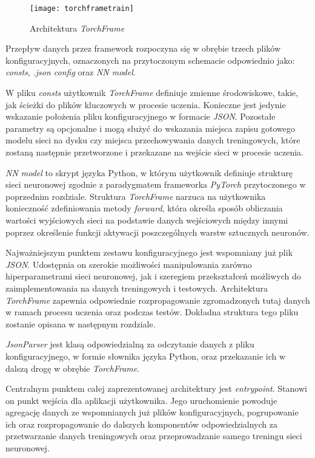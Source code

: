       \begin{figure}[h!]
        \centering
        \texttt{[image: torchframetrain]}
        \caption[Architektura \textit{TorchFrame} - źródło: Rysunek własny]{Architektura \textit{TorchFrame}}
        \label{fig:torchframetrain}
      \end{figure}

    Przepływ danych przez framework rozpoczyna się w obrębie trzech plików konfiguracyjnych,
    oznaczonych na przytoczonym schemacie odpowiednio jako: \textit{consts}, \textit{.json config}
    oraz \textit{NN model}.

    W pliku \textit{consts} użytkownik \textit{TorchFrame} definiuje zmienne środowiskowe, takie, jak
    ścieżki do plików kluczowych w procesie uczenia. Konieczne jest jedynie wskazanie
    położenia pliku konfiguracyjnego w formacie \textit{JSON}. Pozostałe parametry są opcjonalne
    i mogą służyć do wskazania miejsca zapisu gotowego modelu sieci na dysku czy miejsca
    przechowywania danych treningowych, które zostaną następnie przetworzone i przekazane
    na wejście sieci w procesie uczenia.

    \textit{NN model} to skrypt języka Python, w którym użytkownik definiuje strukturę sieci
    neuronowej zgodnie z paradygmatem frameworka \textit{PyTorch} przytoczonego w poprzednim
    rozdziale. Struktura \textit{TorchFrame} narzuca na użytkownika konieczność zdefiniowania
    metody \textit{forward}, która określa sposób obliczania wartości wyjściowych sieci na podstawie danych
    wejściowych między innymi poprzez określenie funkcji aktywacji poszczególnych warstw
    sztucznych neuronów.

    Najważniejszym punktem zestawu konfiguracyjnego jest wspomniany już plik \textit{JSON}.
    Udostępnia on szerokie możliwości manipulowania zarówno hiperparametrami sieci
    neuronowej, jak i szeregiem przekształceń możliwych do zaimplementowania
    na danych treningowych i testowych. Architektura \textit{TorchFrame} zapewnia odpowiednie
    rozpropagowanie zgromadzonych tutaj danych w ramach procesu uczenia oraz podczas
    testów. Dokładna struktura tego pliku zostanie opisana w następnym rozdziale.

    \textit{JsonParser} jest klasą odpowiedzialną za odczytanie danych z pliku konfiguracyjnego,
    w formie słownika języka Python, oraz przekazanie ich w dalszą drogę w obrębie \textit{TorchFrame}.

    Centralnym punktem całej zaprezentowanej architektury jest \textit{entrypoint}. Stanowi on
    punkt wejścia dla aplikacji użytkownika. Jego uruchomienie powoduje
    agregację danych ze wspomnianych już plików konfiguracyjnych, pogrupowanie ich
    oraz rozpropagowanie do dalszych komponentów odpowiedzialnych za przetwarzanie
    danych treningowych oraz przeprowadzanie samego treningu sieci neuronowej.


